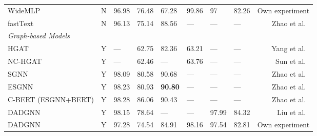 \documentclass[runningheads]{llncs}
\begin{document}
\begin{table*}[!ht]
\begin{threeparttable}
{\begin{tabular}{lcllllllr}
            WideMLP                                 & N                   & 96.98            & 76.48          & 67.28                             & 99.86            & 97            & 82.26          & Own experiment                  \\
            fastText                                & N                   & 96.13            & 75.14          & 88.56\tnote{}          & ---              & ---           & ---            & Zhao et al.~\cite{zhao2021sequential}      \\
            \midrule
            \textit{Graph-based Models} \\
            HGAT\tnote{}                         & Y                   & ---              & 62.75          & 82.36                             & 63.21            & ---           & ---            & Yang et al.~\cite{hgat}                    \\
            NC-HGAT\tnote{}                      & Y                   & ---              & 62.46          & ---                               & 63.76            & ---           & ---            & Sun et al.~\cite{nc-hgat}                 \\
            SGNN\tnote{}                         & Y                   & 98.09            & 80.58          & 90.68\tnote{}                  & ---              & ---           & ---            & Zhao et al.~\cite{zhao2021sequential}      \\
            ESGNN\tnote{}                        & Y                   & 98.23            & 80.93          & \textbf{90.80}\tnote{}         & ---              & ---           & ---            & Zhao et al.~\cite{zhao2021sequential}      \\
            C-BERT (ESGNN+BERT)\tnote{}        & Y                   & 98.28            & 86.06          & 90.43\tnote{}                  & ---              & ---           & ---            & Zhao et al.~\cite{zhao2021sequential}      \\
            DADGNN                                  & Y                   & 98.15            & 78.64          & ---                               & ---              & 97.99         & 84.32          & Liu et al.~\cite{liu2021deep}             \\
            DADGNN                                  & Y                   & 97.28            & 74.54          & 84.91                             & 98.16            & 97.54         & 82.81          & Own experiment                  \\

\end{tabular}}
\end{threeparttable}
\end{table*}
\end{document}

